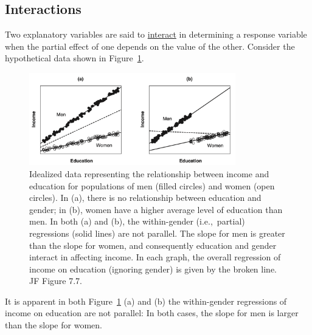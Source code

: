 \subsection*{Interactions}
Two explanatory variables are said to \underline{interact} in determining a response variable when the partial effect of one depends on the value of the other.
Consider the hypothetical data shown in Figure~\ref{fig:interaction}.
%
\begin{figure}[H]
\begin{center}
  \includegraphics[width=0.8\textwidth]{Lecture15/Figure7_7}
  \caption{Idealized data representing the relationship between income and education for populations of men (filled circles) and women (open circles).
  In (a), there is no relationship between education and gender; in (b), women have a higher average level of education than men.
  In both (a) and (b), the within-gender (i.e.,~partial) regressions (solid lines) are not parallel.
  The slope for men is greater than the slope for women, and consequently education and gender interact in affecting income. 
    In each graph, the overall regression of income on education (ignoring gender) is given by the broken line.
   JF Figure 7.7.}
  \label{fig:interaction}
\end{center}
\end{figure}
%
It is apparent in both Figure~\ref{fig:interaction} (a) and (b) the within-gender regressions of income on education are not parallel: In both cases, the slope for men is larger than the slope for women.

